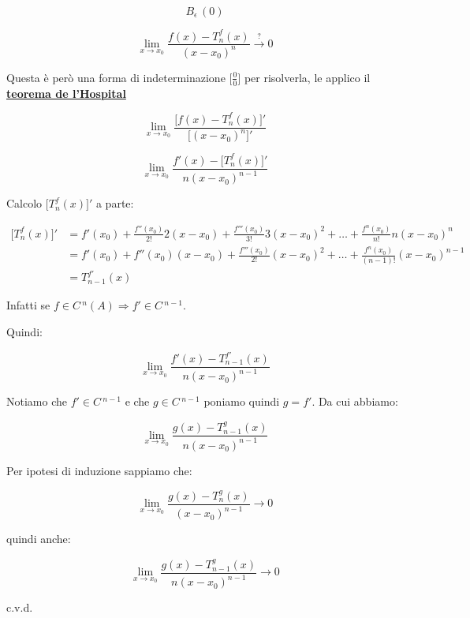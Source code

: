 \documentclass[../dimostrazioni]{subfiles}
\begin{document}
        \[ B_\epsilon \, (0)\]

        \[  \lim_{x \to x_0} \frac{f(x)-T _n ^ f (x)}{(x-x_0)^n} \stackrel{?}{\rightarrow} 0\]

        Questa è però una forma di indeterminazione \(\bigg[\frac{0}{0}\bigg]\) per risolverla, le applico il \textbf{\hyperref[teoHopital]{teorema de l'Hospital}}
        
        \[  \lim_{x \to x_0} \frac{\Big[f(x)-T _n ^ f (x)\Big]'}{\Big[(x-x_0)^n\Big]'}    \]

        \[  \lim_{x \to x_0} \frac{f'(x)-\Big[T _n ^ f (x)\Big]'}{n(x-x_0)^{n-1}}    \]

        Calcolo \(\Big[T _n ^ f (x)\Big]'\) a parte:

        \begin{align*}
            \Big[T _n ^ f (x)\Big]' &= f'(x_0) + \frac{f''(x_0)}{2!}2(x-x_0) + \frac{f'''(x_0)}{3!}3(x-x_0)^2 + \dots + \frac{f^n(x_0)}{n!}n(x-x_0)^n \\
                                    &= f'(x_0) + f''(x_0)(x-x_0) + \frac{f'''(x_0)}{2!}(x-x_0)^2 + \dots + \frac{f^n(x_0)}{(n-1)!}(x-x_0)^{n-1} \\
                                    &= T_{n-1} ^{f'} (x)
        \end{align*}

        Infatti se \(f \in C\,^n (A) \Rightarrow f' \in C\,^{n-1} \).

        Quindi:

        \[  \lim_{x \to x_0} \frac{f'(x)-T_{n-1} ^{f'} (x)}{n(x-x_0)^{n-1}}    \]

        Notiamo che \(f' \in C\,^{n-1}\) e che \(g \in C\,^{n-1}\) poniamo quindi \(g = f'\). Da cui abbiamo:

        \[  \lim_{x \to x_0} \frac{g(x)-T_{n-1} ^{g} (x)}{n(x-x_0)^{n-1}}    \]

        Per ipotesi di induzione sappiamo che:

        \[  \lim_{x \to x_0} \frac{g(x) - T _n ^ g (x)}{(x-x_0)^{n-1}} \rightarrow 0 \]

        quindi anche:

        \[  \lim_{x \to x_0} \frac{g(x)-T_{n-1} ^{g} (x)}{n(x-x_0)^{n-1}}  \rightarrow 0  \]

        c.v.d.

        
\end{document}
